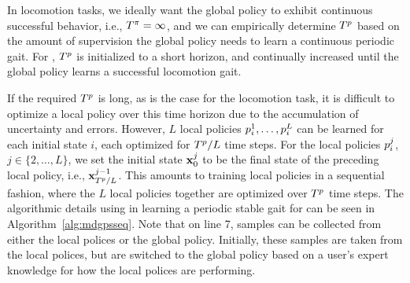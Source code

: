 In locomotion
tasks, we ideally want the global policy to exhibit continuous successful
behavior, i.e., $T^{\pi}=\infty$, and we can empirically determine
$T^{p}$ based on the amount of supervision the global policy needs to
learn a continuous periodic gait.
For \SB{}, $T^{p}$ is initialized to a short horizon, and continually increased 
until the global policy learns a successful locomotion gait.

If the required $T^{p}$ is long, as is the case for the \SB{} locomotion
task, it is difficult to optimize a local policy over this time horizon due to
the accumulation of uncertainty and errors. 
However, $L$ local policies $p_i^1,\ldots,p_i^L$ can be learned for each
initial state $i$, each optimized for $T^{p}/L$ time steps. For the
local policies $p_i^j$, $j\in\{2,\ldots,L\}$, we set the initial state
$\mathbf{x}_0^j$ to be the final state of the preceding local policy, i.e.,
$\mathbf{x}_{T^{p}/L}^{j-1}$. This amounts to training local policies in a
sequential fashion, where the $L$ local policies together are optimized over
$T^{p}$ time steps.
The algorithmic details using in learning a periodic stable gait for \SB{} can be seen in Algorithm~\ref{alg:mdgpsseq}.
Note that on line 7, samples can be collected from either the local polices or the global policy.
Initially, these samples are taken from the local polices, but are switched to the global policy based on a user's expert knowledge for how the local polices are performing.


